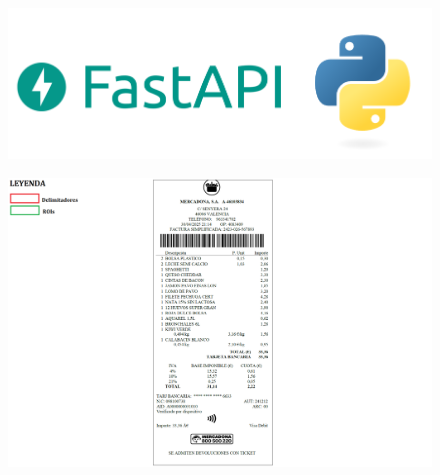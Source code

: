 \documentclass{beamer}
\begin{document}
	


		\begin{frame}
				
			\begin{figure}
				\centering
				\includegraphics[width=1\linewidth]{imgEspecifiques/fastAPIiPythonLogos}
				\label{fig:fastapiipythonlogos}
			\end{figure}
			
		\end{frame}


		\begin{frame}
			\begin{figure}
				\centering
				\includegraphics[width=1\linewidth]{imgEspecifiques/ticketExtraccioA.png}
				\label{fig:ticketExtraccioA}
			\end{figure}
		\end{frame}
		
	
		
\end{document}
